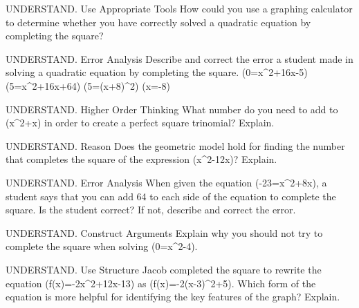 \documentclass{article}
\newenvironment{practice}[2]{}{}        %
\newcommand{\answer}[1]{}               %
\newcommand{\te}[1]{}                   %
\begin{document}
\begin{practice}{11}{2}
UNDERSTAND. Use Appropriate Tools How could you use a graphing calculator to determine whether you have correctly solved a quadratic equation by completing the square?
\answer{You can compare the zeros of the graph to the solutions that you calculated and, because completing the square rearranges the equation to vertex form, you can also compare the vertices.}
\end{practice}
\begin{practice}{12}{2}
UNDERSTAND. Error Analysis Describe and correct the error a student made in solving a quadratic equation by completing the square.
(0=x^2+16x-5)
(5=x^2+16x+64)
(5=(x+8)^2)
(x=-8\pm{})
\te{Student work marked with a red X.}
\answer{The student did not add the value for completing the square, 64, to both sides of the equation.}
\end{practice}
\begin{practice}{13}{2}
UNDERSTAND. Higher Order Thinking What number do you need to add to (x^2+x) in order to create a perfect square trinomial? Explain.
\answer{(\frac{49}{16}); Half of (\frac{7}{2}) is (\frac{7}{4}), and ((\frac{7}{4})^2=\frac{49}{16}).}
\end{practice}
\begin{practice}{14}{3}
UNDERSTAND. Reason Does the geometric model hold for finding the number that completes the square of the expression (x^2-12x)? Explain.
\answer{No; you cannot geometrically depict negative values or subtracted values.}
\end{practice}
\begin{practice}{15}{3}
UNDERSTAND. Error Analysis When given the equation (-23=x^2+8x), a student says that you can add 64 to each side of the equation to complete the square. Is the student correct? If not, describe and correct the error.
\answer{The student forgot to divide the b-term by 2 before squaring it. He or she should have added 16 to each side of the equation to complete the square.}
\end{practice}
\begin{practice}{16}{3}
UNDERSTAND. Construct Arguments Explain why you should not try to complete the square when solving (0=x^2-4).
\answer{There is already a ``complete'' square in the equation, namely (x^2). There is no need to complete the square. Add 4 to each side, then take the square root of each side.}
\end{practice}
\begin{practice}{17}{2}
UNDERSTAND. Use Structure Jacob completed the square to rewrite the equation (f(x)=-2x^2+12x-13) as (f(x)=-2(x-3)^2+5). Which form of the equation is more helpful for identifying the key features of the graph? Explain.
\answer{Answers may vary. Sample: The vertex form of the equation is more helpful because you can immediately identify the vertex of the graph.}
\end{practice}
\end{document}
